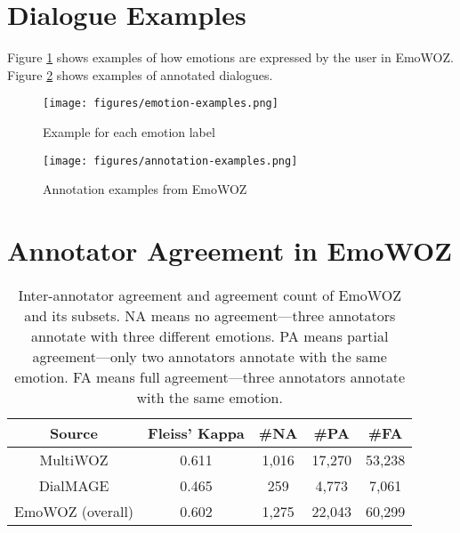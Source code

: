 \documentclass[10pt, a4paper]{article}
\begin{document}
\newpage
{}
\section{Dialogue Examples}
\label{sec:dialogue-examples}
Figure \ref{fig:emotion-examples} shows examples of how emotions are expressed by the user in EmoWOZ. Figure \ref{fig:annotation-examples} shows examples of annotated dialogues.
\begin{figure}[!htbp]
    \centering
    \texttt{[image: figures/emotion-examples.png]}
    \caption{Example for each emotion label}
    \label{fig:emotion-examples}
\end{figure}

\begin{figure}[!htbp]
    \centering
    \texttt{[image: figures/annotation-examples.png]}
    \caption{Annotation examples from EmoWOZ}
    \label{fig:annotation-examples}
\end{figure}

\newpage
\setcounter{table}{0}
\renewcommand{\thetable}{\Alph{section}\arabic{table}}
\section{Annotator Agreement in EmoWOZ}
\label{sec:annotator-agreement}
\begin{table}[!htbp]
\centering
\small
\setlength\tabcolsep{3pt}
\begin{tabular}{ccccc}
\toprule[1pt]
\textbf{Source} & \textbf{Fleiss' Kappa} & \textbf{\#NA} & \textbf{\#PA} & \textbf{\#FA}  \\
\hline
MultiWOZ & 0.611 & 1,016 & 17,270 & 53,238  \\
DialMAGE & 0.465 & 259 & 4,773 & 7,061 \\
\hline
EmoWOZ (overall) & 0.602 & 1,275 & 22,043 & 60,299\\
\bottomrule[1pt]
\end{tabular}
\caption{Inter-annotator agreement and agreement count of EmoWOZ and its subsets. NA means no agreement---three annotators annotate with three different emotions. PA means partial agreement---only two annotators annotate with the same emotion. FA means full agreement---three annotators annotate with the same emotion.}
\label{tab:agreement}
\end{table}

\setcounter{table}{0}
\renewcommand{\thetable}{\Alph{section}\arabic{table}}
\end{document}

